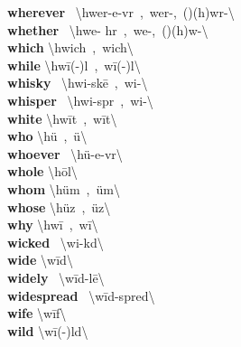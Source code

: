 \documentclass[10pt,a4paper]{article}
\begin{document}
\begin{multicols}{2}
\textbf{ wherever }\quad \ \textbackslash hwer-\textprimstress e-v\textschwa r\ ,\ wer-,\ (\textsecstress )(h)w\textschwa r-\textbackslash \\
\textbf{ whether }\quad \ \textbackslash \textprimstress hwe- h\textschwa r\ ,\ \textprimstress we-,\ (\textsecstress )(h)w\textschwa -\textbackslash \\
\textbf{ which }\quad \textbackslash \textprimstress hwich\ ,\ \textprimstress wich\textbackslash \\
\textbf{ while }\quad \textbackslash \textprimstress hw\={i}(-\textschwa )l\ ,\ \textprimstress w\={i}(-\textschwa )l\textbackslash \\
\textbf{ whisky }\quad \ \textbackslash \textprimstress hwi-sk\={e}\ ,\ \textprimstress wi-\textbackslash \\
\textbf{ whisper }\quad \ \textbackslash \textprimstress hwi-sp\textschwa r\ ,\ \textprimstress wi-\textbackslash \\
\textbf{ white }\quad \textbackslash \textprimstress hw\={i}t\ ,\ \textprimstress w\={i}t\textbackslash \\
\textbf{ who }\quad \textbackslash \textprimstress h\"{u}\ ,\ \"{u}\textbackslash \\
\textbf{ whoever }\quad \ \textbackslash h\"{u}-\textprimstress e-v\textschwa r\textbackslash \\
\textbf{ whole }\quad \textbackslash \textprimstress h\={o}l\textbackslash \\
\textbf{ whom }\quad \textbackslash \textprimstress h\"{u}m\ ,\ \"{u}m\textbackslash \\
\textbf{ whose }\quad \textbackslash \textprimstress h\"{u}z\ ,\ \"{u}z\textbackslash \\
\textbf{ why }\quad \textbackslash \textprimstress hw\={i}\ ,\ \textprimstress w\={i}\textbackslash \\
\textbf{ wicked }\quad \ \textbackslash \textprimstress wi-k\textschwa d\textbackslash \\
\textbf{ wide }\quad \textbackslash \textprimstress w\={i}d\textbackslash \\
\textbf{ widely }\quad \ \textbackslash \textprimstress w\={i}d-l\={e}\textbackslash \\
\textbf{ widespread }\quad \ \textbackslash \textprimstress w\={i}d-\textprimstress spred\textbackslash \\
\textbf{ wife }\quad \textbackslash \textprimstress w\={i}f\textbackslash \\
\textbf{ wild }\quad \textbackslash \textprimstress w\={i}(-\textschwa )ld\textbackslash \\

\end{multicols}
\end{document}
